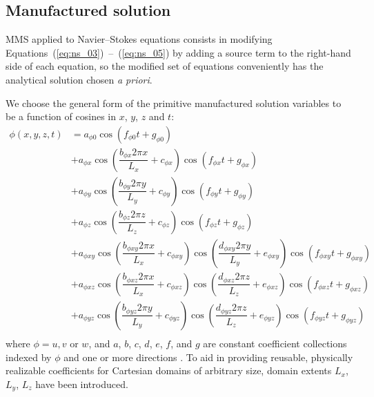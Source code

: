 \documentclass[10pt]{article}
\begin{document}
\begin{landscape}
\section{Manufactured solution}

MMS applied to Navier--Stokes equations consists in modifying Equations~(\ref{eq:ns_03})~--~(\ref{eq:ns_05}) by adding a source term to the right-hand side of each equation, so the modified set of equations conveniently has the analytical solution chosen \textit{a priori}.

We choose the general form of the primitive manufactured solution variables to be  a function of  cosines in $x$, $y$, $z$ and $t$:
\begin{equation}
\begin{split}\label{eq:manufactured_Rhys}
  \phi\!\left(x, y, z, t\right)
 &=  a_{\phi 0}   \cos\left(f_{\phi 0 }  t  +  g_{\phi 0 }\right)       \\
 &+  a_{\phi x }  \cos\left(\dfrac{ b_{\phi x }  2\pi x }{L_x} +c_{\phi x }\right)  \cos\left(f_{\phi x }  t  +  g_{\phi x }\right) \\
 &+  a_{\phi y }  \cos\left(\dfrac{ b_{\phi y }  2\pi y }{L_y} +c_{\phi y }\right)  \cos\left(f_{\phi y }  t  +  g_{\phi y }\right) \\
 &+  a_{\phi z }  \cos\left(\dfrac{ b_{\phi z }  2\pi z }{L_z} +c_{\phi z }\right)  \cos\left(f_{\phi z }  t  +  g_{\phi z }\right) \\
 &+  a_{\phi xy}  \cos\left(\dfrac{ b_{\phi xy}  2\pi x }{L_x} +c_{\phi xy}\right)  \cos\left(\dfrac{ d_{\phi xy}  2\pi y }{L_y}   +  e_{\phi xy}\right)   \cos\left(f_{\phi xy}  t  +  g_{\phi xy}\right) \\
 &+  a_{\phi xz}  \cos\left(\dfrac{ b_{\phi xz}  2\pi x }{L_x} +c_{\phi xz}\right)  \cos\left(\dfrac{ d_{\phi xz}  2\pi z }{L_z}  +  e_{\phi xz}\right)   \cos\left(f_{\phi xz}  t  +  g_{\phi xz}\right) \\
 &+  a_{\phi yz}  \cos\left(\dfrac{ b_{\phi yz}  2\pi y }{L_y} +c_{\phi yz}\right)  \cos\left(\dfrac{ d_{\phi yz}  2\pi z }{L_z}  +  e_{\phi yz}\right)   \cos\left(f_{\phi yz}  t  +  g_{\phi yz}\right) \\
\end{split}
\end{equation}
where $\phi=u,v$ or $w$, and $a$, $b$, $c$, $d$, $e$, $f$, and $g$ are constant coefficient
collections indexed by $\phi$ and one or more directions \citep{Rhys2011}.  To aid in providing
reusable, physically realizable coefficients for Cartesian domains of arbitrary
size, domain extents $L_x$, $L_y$, $L_z$ have been introduced.


\end{landscape}
\end{document}
